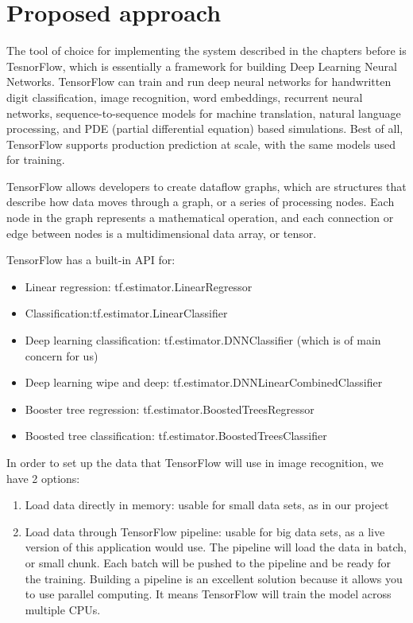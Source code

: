 \documentclass[runningheads,a4paper,11pt]{report}
\begin{document}
\chapter{Proposed approach}
\label{chapter:proposedApproach}


The tool of choice for implementing the system described in the chapters before is TesnorFlow, which is essentially a framework for building Deep Learning Neural Networks. TensorFlow can train and run deep neural networks for handwritten digit classification, image recognition, word embeddings, recurrent neural networks, sequence-to-sequence models for machine translation, natural language processing, and PDE (partial differential equation) based simulations. Best of all, TensorFlow supports production prediction at scale, with the same models used for training.

TensorFlow allows developers to create dataflow graphs, which are structures that describe how data moves through a graph, or a series of processing nodes. Each node in the graph represents a mathematical operation, and each connection or edge between nodes is a multidimensional data array, or tensor.

TensorFlow has a built-in API for: 
\begin{itemize}
  \item Linear regression: tf.estimator.LinearRegressor 
  \item Classification:tf.estimator.LinearClassifier 
  \item Deep learning classification: tf.estimator.DNNClassifier (which is of main concern for us)
  \item Deep learning wipe and deep: tf.estimator.DNNLinearCombinedClassifier 
  \item Booster tree regression: tf.estimator.BoostedTreesRegressor 
  \item Boosted tree classification: tf.estimator.BoostedTreesClassifier 
\end{itemize}

In order to set up the data that TensorFlow will use in image recognition, we have 2 options:

\begin{enumerate}
  \item Load data directly in memory: usable for small data sets, as in our project
  \item Load data through TensorFlow pipeline: usable for big data sets, as a live version of this application would use. The pipeline will load the data in batch, or small chunk. Each batch will be pushed to the pipeline and be ready for the training. Building a pipeline is an excellent solution because it allows you to use parallel computing. It means TensorFlow will train the model across multiple CPUs. 
\end{enumerate}
\end{document}
